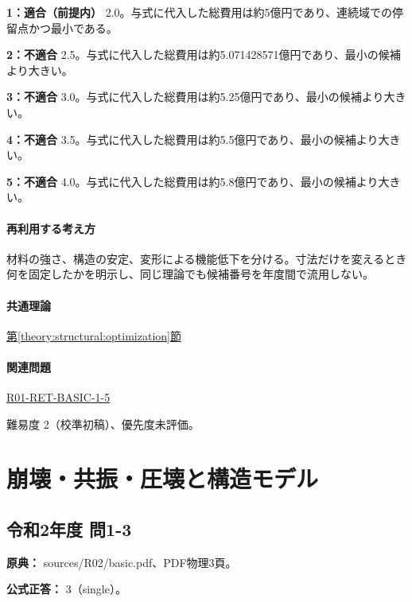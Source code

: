 \noindent\textbf{1：適合（前提内）} 2.0。与式に代入した総費用は約5億円であり、連続域での停留点かつ最小である。\par

\noindent\textbf{2：不適合} 2.5。与式に代入した総費用は約5.071428571億円であり、最小の候補より大きい。\par

\noindent\textbf{3：不適合} 3.0。与式に代入した総費用は約5.25億円であり、最小の候補より大きい。\par

\noindent\textbf{4：不適合} 3.5。与式に代入した総費用は約5.5億円であり、最小の候補より大きい。\par

\noindent\textbf{5：不適合} 4.0。与式に代入した総費用は約5.8億円であり、最小の候補より大きい。\par

\paragraph{再利用する考え方} 材料の強さ、構造の安定、変形による機能低下を分ける。寸法だけを変えるとき何を固定したかを明示し、同じ理論でも候補番号を年度間で流用しない。

\paragraph{共通理論} \hyperref[theory:structural:optimization]{第\ref*{theory:structural:optimization}節}

\paragraph{関連問題} \hyperref[q:r01-ret-basic-1-5]{R01-RET-BASIC-1-5}

\par 難易度 2（校準初稿）、優先度未評価。

\section{崩壊・共振・圧壊と構造モデル}

\subsection{令和2年度 問1-3}
\label{q:r02-reg-basic-1-3}

\noindent\textbf{原典：} sources/R02/basic.pdf、PDF物理3頁。

\textbf{公式正答：} 3（single）。

